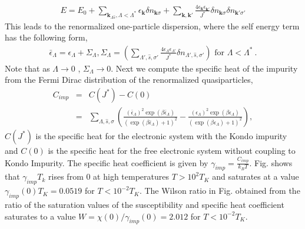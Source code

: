 \documentclass[aps,prb,preprint,groupedaddress]{revtex4-2}
\begin{document}
\begin{eqnarray}
E=E_{0}+\sum_{\mathbf{k}_{\Lambda\hat{s}},\Lambda<\Lambda^{*}}\epsilon_{\mathbf{k}}\delta n_{\mathbf{k}\sigma}+\sum_{\mathbf{k},\mathbf{k}'}\frac{4\epsilon_{\mathbf{k}}\epsilon_{\mathbf{k}'}}{J^{*}}\delta n_{\mathbf{k}\sigma}\delta n_{\mathbf{k}'\sigma'}
\end{eqnarray}
This leads to the renormalized one-particle dispersion, where the  self energy term has the following form,
\begin{eqnarray}
\bar{\epsilon}_{\Lambda}=\epsilon_{\Lambda}+\Sigma_{\Lambda} ,\Sigma_{\Lambda}=(\sum_{\Lambda',\hat{s},\sigma'}\frac{4\epsilon_{\Lambda}\epsilon_{\Lambda'}}{J^{*}}\delta n_{\Lambda',\hat{s},\sigma'}) \text{ for }\Lambda<\Lambda^{*}~. 
\end{eqnarray}
Note that as $\Lambda\to 0$ , $\Sigma_{\Lambda}\to 0$. Next we compute the specific heat of the impurity from the Fermi Dirac distribution of the renormalized quasiparticles,
\begin{eqnarray}
C_{imp}&=&C(J^{*})-C(0)\nonumber\\
&=&\sum_{\Lambda,\hat{s},\sigma}\left(\frac{(\bar{\epsilon}_{\Lambda})^{2}\exp(\beta\bar{\epsilon}_{\Lambda})}{(\exp(\beta\bar{\epsilon}_{\Lambda})+1)^{2}}-\frac{(\epsilon_{\Lambda})^{2}\exp(\beta\epsilon_{\Lambda})}{(\exp(\beta\epsilon_{\Lambda})+1)^{2}}\right),
\end{eqnarray}
$C(J^{*})$ is the specific heat for the electronic system with the Kondo impurity and $C(0)$ is the specific heat for the free electronic system without coupling to Kondo Impurity. The specific heat coefficient is given by $\gamma_{imp}=\frac{C_{imp}}{k_{B}T}$. Fig. shows that $\gamma_{imp}T_{k}$ rises from 0 at high temperatures $T>10^{2}T_{K}$ and saturates at a value $\gamma_{imp}(0)T_{K}=0.0519$ for $T<10^{-2}T_{K}$. The Wilson ratio in Fig. obtained from the ratio of the saturation values of the susceptibility and specific heat coefficient saturates to a value $W=\chi(0)/\gamma_{imp}(0)=2.012$ for $T<10^{-2}T_{K}$.
\end{document}
